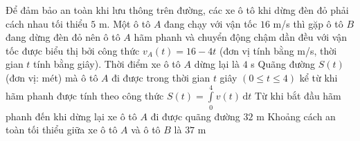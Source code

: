 \begin{ex}%
Để đảm bảo an toàn khi lưu thông trên đường, các xe ô tô khi dừng đèn đỏ phải cách nhau tối thiểu $5$ m. Một ô tô $A$ đang chạy với vận tốc $16$ m/s thì gặp ô tô $B$ đang dừng đèn đỏ nên ô tô $A$ hãm phanh và chuyển động chậm dần đều với vận tốc được biểu thị bởi công thức $v_A(t)=16-4t$ (đơn vị tính bằng m/s, thời gian $t$ tính bằng giây).
\choiceTF
{\True Thời điểm xe ô tô $A$ dừng lại là $4$ s}
{Quãng đường $S(t)$ (đơn vị: mét) mà ô tô $A$ đi được trong thời gian $t$ giây $(0\le t\le 4)$ kể từ khi hãm phanh được tính theo công thức $S(t)=\displaystyle\int\limits_{0}^{4} v(t)\mathrm{\,d}t$}
{\True Từ khi bắt đầu hãm phanh đến khi dừng lại xe ô tô $A$ đi được quãng đường $32$ m}
{\True Khoảng cách an toàn tối thiểu giữa xe ô tô $A$ và ô tô $B$ là $37$ m}
\end{ex}

